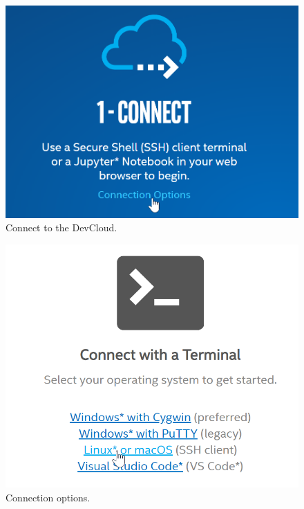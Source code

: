 \documentclass[11pt, twoside, pdftex]{article}
\begin{document}
\begin{figure}[H]
   \begin{center}
      \includegraphics[scale=0.8]{figures/connect.png}
   \caption{Connect to the DevCloud.} 
	 \label{fig:connect}
	 \end{center}
\end{figure}

\begin{figure}[H]
   \begin{center}
      \includegraphics[scale=0.8]{figures/connect_terminal.png}
   \caption{Connection options.} 
	 \label{fig:connect_terminal}
	 \end{center}
\end{figure}
\end{document}

